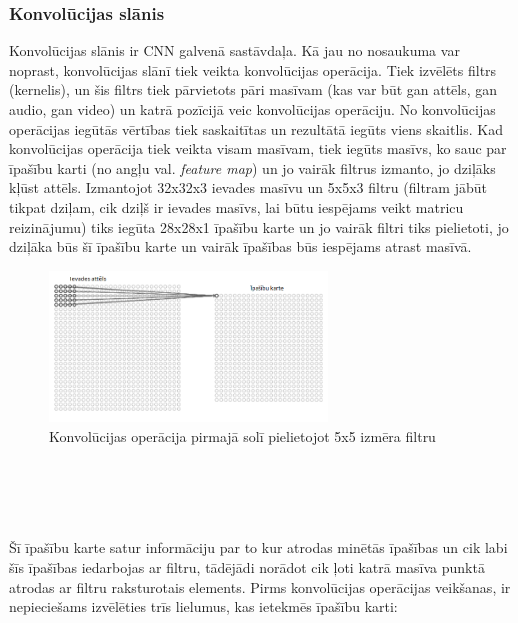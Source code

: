 \subsubsection{Konvolūcijas slānis}
Konvolūcijas slānis ir CNN galvenā sastāvdaļa. Kā jau no nosaukuma var noprast, konvolūcijas slānī tiek veikta konvolūcijas operācija. Tiek izvēlēts filtrs (kernelis), un šis filtrs tiek pārvietots pāri masīvam (kas var būt gan attēls, gan audio, gan video) un katrā pozīcijā veic konvolūcijas operāciju. No konvolūcijas operācijas iegūtās vērtības tiek saskaitītas un rezultātā iegūts viens skaitlis. Kad konvolūcijas operācija tiek veikta visam masīvam, tiek iegūts masīvs, ko sauc par īpašību karti (no angļu val. \textit{feature map}) un jo vairāk filtrus izmanto, jo dziļāks kļūst attēls. Izmantojot 32x32x3 ievades masīvu un 5x5x3 filtru (filtram jābūt tikpat dziļam, cik dziļš ir ievades masīvs, lai būtu iespējams veikt matricu reizinājumu) tiks iegūta 28x28x1 īpašību karte un jo vairāk filtri tiks pielietoti, jo dziļāka būs šī īpašību karte un vairāk īpašības būs iespējams atrast masīvā. 
\begin{figure}[h]%
	\centering
	\includegraphics[height=4cm]{images/ActivationMap.png} %
	\caption{Konvolūcijas operācija pirmajā solī pielietojot 5x5 izmēra filtru}%
	\label{fig:example}%
\end{figure}
\\
~
\\
~
\\
~
\\

Šī īpašību karte satur informāciju par to kur atrodas minētās īpašības un cik labi šīs īpašības iedarbojas ar filtru, tādējādi norādot cik ļoti katrā masīva punktā atrodas ar filtru raksturotais elements. Pirms konvolūcijas operācijas veikšanas, ir nepieciešams izvēlēties trīs lielumus, kas ietekmēs īpašību karti:

